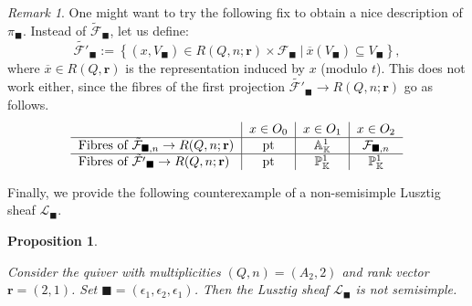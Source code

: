 \documentclass[11pt,english]{article}
\numberwithin{equation}{section}
\numberwithin{figure}{section}
\theoremstyle{definition}
\theoremstyle{plain}
\newtheorem{prop}[df]{Proposition}
\theoremstyle{remark}
\newtheorem{rmk}[df]{Remark}
\newcommand\rr{\mathbf{r}}
\newcommand\KK{\mathbb{K}}
\begin{document}
\begin{rmk}

One might want to try the following fix to obtain a nice description
of $\pi_{\blacksquare}$. Instead of $\tilde{\mathcal{F}}_{\blacksquare}$,
let us define:\[
\tilde{\mathcal{F}'}_{\blacksquare}:=\left\{(x,V_{\blacksquare})\in R(Q,n;\rr)\times \mathcal{F}_{\blacksquare}\ \vert\ \overline{x}(V_{\blacksquare})\subseteq V_{\blacksquare} \right\},
\]where $\overline{x}\in R(Q,\rr)$ is the representation induced by
$x$ (modulo $t$). This does not work either, since the fibres of
the first projection $\tilde{\mathcal{F}'}_{\blacksquare}\rightarrow R(Q,n;\rr)$
go as follows.\[
\begin{tabular}{l|c|c|c}
& $x\in O_0$ & $x\in O_1$ & $x\in O_2$ \\
\hline
$\text{Fibres of }\tilde{\mathcal{F}}_{\blacksquare,n}\rightarrow R(Q,n;\rr)$ & $\mathrm{pt}$ & $\mathbb{A}_{\KK}^1$ & $\mathcal{F}_{\blacksquare,n}$ \\
\hline
$\text{Fibres of }\tilde{\mathcal{F}'}_{\blacksquare}\rightarrow R(Q,n;\rr)$ & $\mathrm{pt}$ & $\mathbb{P}_{\KK}^1$ & $\mathbb{P}_{\KK}^1$
\end{tabular}
\]

\end{rmk}

Finally, we provide the following counterexample of a non-semisimple
Lusztig sheaf $\mathcal{L}_{\blacksquare}$.

\begin{prop} \label{Prop/SemisimpFail}

Consider the quiver with multiplicities $(Q,n)=(A_{2},2)$ and rank
vector $\rr=(2,1)$. Set $\blacksquare=(\epsilon_{1},\epsilon_{2},\epsilon_{1})$.
Then the Lusztig sheaf $\mathcal{L}_{\blacksquare}$ is not semisimple.

\end{prop}
\end{document}
